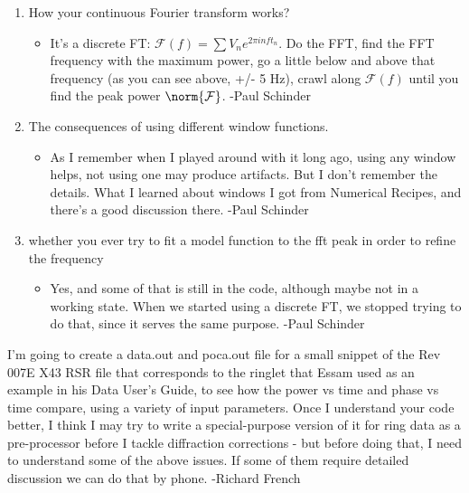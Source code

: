 \documentclass[crop=false,class=book]{standalone}
\begin{document}
\begin{enumerate}
            \item How your continuous Fourier transform works?
            \begin{itemize}
                \item It’s a discrete FT: $\mathcal{F}(f) = \sum V_n e^{2\pi i n f t_n}$. Do the FFT, find the FFT frequency with the maximum power, go a little below and above that frequency (as you can see above, +/- 5 Hz), crawl along $\mathcal{F}(f)$ until you find the peak power $\norm{\mathcal{F}}$. -Paul Schinder
            \end{itemize}
            \item The consequences of using different window functions.
            \begin{itemize}
                \item As I remember when I played around with it long ago, using any window helps, not using one may produce artifacts.  But I don’t remember the details.  What I learned about windows I got from Numerical Recipes, and there’s a good discussion there. -Paul Schinder
            \end{itemize}
            \item whether you ever try to fit a model function to the fft peak in order to refine the frequency
            \begin{itemize}
                \item Yes, and some of that is still in the code, although maybe not in a working state.  When we started using a discrete FT, we stopped trying to do that, since it serves the same purpose. -Paul Schinder
            \end{itemize}
        \end{enumerate}
        I'm going to create a data.out and poca.out file for a small snippet of the Rev 007E X43 RSR file that corresponds to the ringlet that Essam used as an example in his Data User's Guide, to see how the power vs time and phase vs time compare, using a variety of input parameters. Once I understand your code better, I think I may try to write a special-purpose version of it for ring data as a pre-processor before I tackle diffraction corrections - but before doing that, I need to understand  some of the above issues. If some of them require detailed discussion we can do that by phone. -Richard French
\end{document}
